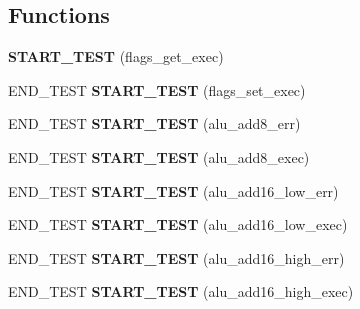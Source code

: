 \subsection*{Functions}
\begin{DoxyCompactItemize}
\item 
\mbox{\label{unit-test-alu_8c_aebc0b969f0efb7d792af3cc9bcd18907}} 
{\bfseries S\+T\+A\+R\+T\+\_\+\+T\+E\+ST} (flags\+\_\+get\+\_\+exec)
\item 
\mbox{\label{unit-test-alu_8c_ac69780b0b006f55440bf4c82c6ce9029}} 
E\+N\+D\+\_\+\+T\+E\+ST {\bfseries S\+T\+A\+R\+T\+\_\+\+T\+E\+ST} (flags\+\_\+set\+\_\+exec)
\item 
\mbox{\label{unit-test-alu_8c_aa037737aea6bcce5c6197456a8e3c987}} 
E\+N\+D\+\_\+\+T\+E\+ST {\bfseries S\+T\+A\+R\+T\+\_\+\+T\+E\+ST} (alu\+\_\+add8\+\_\+err)
\item 
\mbox{\label{unit-test-alu_8c_a2409940f645abfdce43bb61e10594b97}} 
E\+N\+D\+\_\+\+T\+E\+ST {\bfseries S\+T\+A\+R\+T\+\_\+\+T\+E\+ST} (alu\+\_\+add8\+\_\+exec)
\item 
\mbox{\label{unit-test-alu_8c_a62cb716b15c04b9f6702229fef176046}} 
E\+N\+D\+\_\+\+T\+E\+ST {\bfseries S\+T\+A\+R\+T\+\_\+\+T\+E\+ST} (alu\+\_\+add16\+\_\+low\+\_\+err)
\item 
\mbox{\label{unit-test-alu_8c_a20f503022b559184f57e5c8c5af84c6a}} 
E\+N\+D\+\_\+\+T\+E\+ST {\bfseries S\+T\+A\+R\+T\+\_\+\+T\+E\+ST} (alu\+\_\+add16\+\_\+low\+\_\+exec)
\item 
\mbox{\label{unit-test-alu_8c_adb6ce08e23edfca5ccc9526b161fb581}} 
E\+N\+D\+\_\+\+T\+E\+ST {\bfseries S\+T\+A\+R\+T\+\_\+\+T\+E\+ST} (alu\+\_\+add16\+\_\+high\+\_\+err)
\item 
\mbox{\label{unit-test-alu_8c_a39afdeb5ca5d55174a2a174f9e24d031}} 
E\+N\+D\+\_\+\+T\+E\+ST {\bfseries S\+T\+A\+R\+T\+\_\+\+T\+E\+ST} (alu\+\_\+add16\+\_\+high\+\_\+exec)
\item 
\mbox{\label{unit-test-alu_8c_a799d19463c6d352c56f934f0c718ed1a}} 

\end{DoxyCompactItemize}
